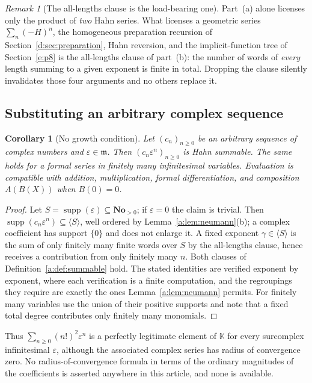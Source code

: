 \documentclass[11pt,a4paper]{article}
\numberwithin{equation}{section}
\newtheorem{corollary}[theorem]{Corollary}
\theoremstyle{definition}
\theoremstyle{remark}
\newtheorem{remark}[theorem]{Remark}
\theoremstyle{plain}
\newcommand{\K}{\mathbb K}
\newcommand{\No}{\mathbf{No}}
\newcommand{\mm}{\mathfrak m}
\DeclareMathOperator{\supp}{supp}
\newcommand{\Neu}[1]{\langle #1\rangle}
\begin{document}
\begin{remark}[The all-lengths clause is the load-bearing one]\label{a:rule:wordlength}
Part~(a) alone licenses only the product of \emph{two} Hahn series.
What licenses a geometric series $\sum_n(-H)^n$, the homogeneous
preparation recursion of Section~\ref{d:sec:preparation}, Hahn reversion, and the implicit-function
tree of Section~\ref{e:p8} is the all-lengths clause of part~(b): the number of
words of \emph{every} length summing to a given exponent is finite in
total.  Dropping the clause silently invalidates those four arguments
and no others replace it.
\end{remark}

\subsection{Substituting an arbitrary complex sequence}\label{a:sec:substitution}

\begin{corollary}[No growth condition]\label{a:cor:complexsub}
Let $(c_n)_{n\ge0}$ be an \emph{arbitrary} sequence of complex numbers
and $\varepsilon\in\mm$.  Then $(c_n\varepsilon^{n})_{n\ge0}$ is Hahn
summable.  The same holds for a formal series in finitely many
infinitesimal variables.  Evaluation is compatible with addition,
multiplication, formal differentiation, and composition $A(B(X))$ when
$B(0)=0$.
\end{corollary}

\begin{proof}
Let $S=\supp(\varepsilon)\subseteq\No_{>0}$; if $\varepsilon=0$ the
claim is trivial.  Then $\supp(c_n\varepsilon^{n})\subseteq\Neu S$, well
ordered by Lemma~\ref{a:lem:neumann}(b); a complex coefficient has
support $\{0\}$ and does not enlarge it.  A fixed exponent
$\gamma\in\Neu S$ is the sum of only finitely many finite words over
$S$ by the all-lengths clause, hence receives a contribution from only
finitely many $n$.  Both clauses of
Definition~\ref{a:def:summable} hold.  The stated identities are
verified exponent by exponent, where each verification is a finite
computation, and the regroupings they require are exactly the ones
Lemma~\ref{a:lem:neumann} permits.  For finitely many variables use the
union of their positive supports and note that a fixed total degree
contributes only finitely many monomials.
\end{proof}

Thus $\sum_{n\ge0}(n!)^{2}\varepsilon^{n}$ is a perfectly legitimate
element of $\K$ for every surcomplex infinitesimal $\varepsilon$,
although the associated complex series has radius of convergence zero.
No radius-of-convergence formula in terms of the ordinary magnitudes of
the coefficients is asserted anywhere in this article, and none is
available.
\end{document}
